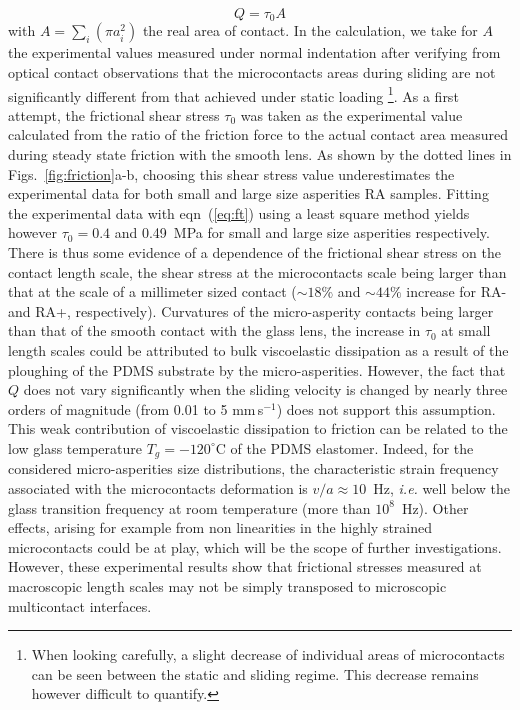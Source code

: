 \documentclass[pre,groupedaddress,showkeys,showpacs,twocolumn]{revtex4}
\begin{document}
%
\begin{equation}
	Q=\tau_0 A
	\label{eq:ft}
\end{equation}
%
with $A=\sum_i (\pi a_i^2)$ the real area of contact. In the calculation, we take for $A$ the experimental values measured under normal indentation after verifying from optical contact observations that the microcontacts areas during sliding are not significantly different from that achieved under static loading \footnote[2]{When looking carefully, a slight decrease of individual areas of microcontacts can be seen between the static and sliding regime. This decrease remains however difficult to quantify.}. As a first attempt, the frictional shear stress $\tau_0$ was taken as the experimental value calculated from the ratio of the friction force to the actual contact area measured during steady state friction with the smooth lens. As shown by the dotted lines in Figs.~\ref{fig:friction}a-b, choosing this shear stress value underestimates the experimental data for both small and large size asperities RA samples. Fitting the experimental data with eqn~(\ref{eq:ft}) using a least square method yields however $\tau_0=0.4$ and 0.49~MPa for small and large size asperities respectively. There is thus some evidence of a dependence of the frictional shear stress on the contact length scale, the shear stress at the microcontacts scale being larger  than that at the scale of a millimeter sized contact ($\sim 18\%$ and $\sim 44\%$ increase for RA- and RA+, respectively). Curvatures of the micro-asperity contacts being larger than that of the smooth contact with the glass lens, the increase in $\tau_0$ at small length scales could be attributed to bulk viscoelastic dissipation as a result of the ploughing of the PDMS substrate by the micro-asperities. However, the fact that $Q$ does not vary significantly when the sliding velocity is changed by nearly three orders of magnitude (from 0.01 to 5 mm\,s$^{-1}$) does not support this assumption. This weak contribution of viscoelastic dissipation to friction can be related to the low glass temperature $T_g=-120^{\circ}$C of the PDMS elastomer. Indeed, for the considered micro-asperities size distributions, 
the characteristic strain frequency associated with the microcontacts deformation is $v/a \approx 10$~Hz, \textit{i.e.} well below the glass transition frequency at room temperature (more than $10^8$~Hz). Other effects, arising for example from non linearities in the highly strained microcontacts could be at play, which will be the scope of further investigations. However, these 
experimental results show that frictional stresses measured at macroscopic length scales may not be simply transposed to microscopic multicontact interfaces. 
%
\end{document}
